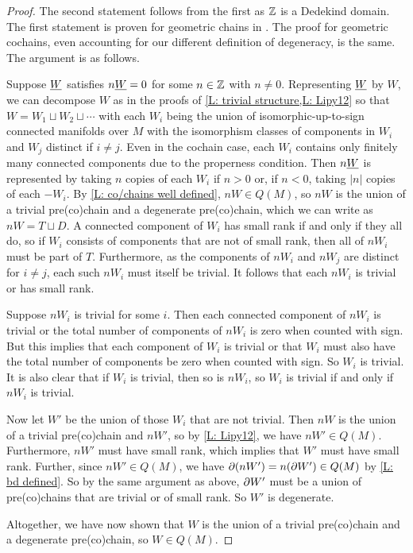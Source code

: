 \begin{proof}
	The second statement follows from the first as $\mathbb{Z}$ is a Dedekind domain.
	The first statement is proven for geometric chains in \cite[Lemma 34]{Lipy14}.
	The proof for geometric cochains, even accounting for our different definition of degeneracy, is the same.
	The argument is as follows.

	Suppose $\underline{W}$ satisfies $n \underline{W} = 0$ for some $n \in \mathbb{Z}$ with $n \neq 0$.
	Representing $\underline{W}$ by $W$, we can decompose $W$ as in the proofs of \cref{L: trivial structure,L: Lipy12} so that $W = W_1 \sqcup W_2 \sqcup \cdots$ with each $W_i$ being the union of isomorphic-up-to-sign connected manifolds over $M$ with the isomorphism classes of components in $W_i$ and $W_j$ distinct if $i\neq j$.
	Even in the cochain case, each $W_i$ contains only finitely many connected components due to the properness condition.
	Then $n \underline{W}$ is represented by taking $n$ copies of each $W_i$ if $n > 0$ or, if $n < 0$, taking $|n|$ copies of each $-W_i$.
	By \cref{L: co/chains well defined}, $n W \in Q(M)$, so $nW$ is the union of a trivial pre(co)chain and a degenerate pre(co)chain, which we can write as $nW = T \sqcup D$.
	A connected component of $W_i$ has small rank if and only if they all do, so if $W_i$ consists of components that are not of small rank, then all of $nW_i$ must be part of $T$.
	Furthermore, as the components of $nW_i$ and $nW_j$ are distinct for $i \neq j$, each such $nW_i$ must itself be trivial.
	It follows that each $n W_i$ is trivial or has small rank.

	Suppose $n W_i$ is trivial for some $i$.
	Then each connected component of $n W_i$ is trivial or the total number of components of $n W_i$ is zero when counted with sign.
	But this implies that each component of $W_i$ is trivial or that $W_i$ must also have the total number of components be zero when counted with sign.
	So $W_i$ is trivial.
	It is also clear that if $W_i$ is trivial, then so is $n W_i$, so $W_i$ is trivial if and only if $n W_i$ is trivial.

	Now let $W'$ be the union of those $W_i$ that are not trivial.
	Then $nW$ is the union of a trivial pre(co)chain and $n W'$, so by \cref{L: Lipy12}, we have $n W' \in Q(M)$.
	Furthermore, $n W'$ must have small rank, which implies that $W'$ must have small rank.
	Further, since $n W' \in Q(M)$, we have $\partial (n W') = n (\partial W') \in Q(M)$ by \cref{L: bd defined}.
	So by the same argument as above, $\partial W'$ must be a union of pre(co)chains that are trivial or of small rank.
	So $W'$ is degenerate.

	Altogether, we have now shown that $W$ is the union of a trivial pre(co)chain and a degenerate pre(co)chain, so $W \in Q(M)$.
\end{proof}


